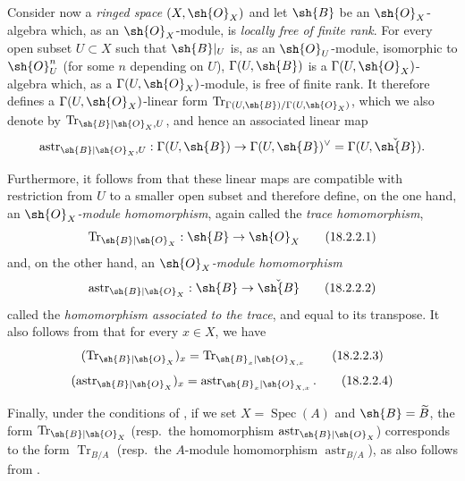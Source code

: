 \begin{env}[18.2.2]
\label{IV.18.2.2}
Consider now a \emph{ringed space} $(X,\sh{O}_X)$ and let $\sh{B}$ be an $\sh{O}_X$-algebra which, as an $\sh{O}_X$-module, is \emph{locally free of finite rank}.  For every open subset $U\subset X$ such that $\sh{B}|_U$ is, as an $\sh{O}_U$-module, isomorphic to $\sh{O}_U^n$ (for some $n$ depending on $U$), $\Gamma(U,\sh{B})$ is a $\Gamma(U,\sh{O}_X)$-algebra which, as a $\Gamma(U,\sh{O}_X)$-module, is free of finite rank.  It therefore defines a $\Gamma(U,\sh{O}_X)$-linear form $\operatorname{Tr}_{\Gamma(U,\sh{B})/\Gamma(U,\sh{O}_X)}$, which we also denote by $\operatorname{Tr}_{\sh{B}|\sh{O}_X,U}$, and hence an associated linear map
\[
\operatorname{astr}_{\sh{B}|\sh{O}_X,U}:\Gamma(U,\sh{B})\to\Gamma(U,\sh{B})^\vee=\Gamma(U,\check{\sh{B}}).
\]

Furthermore, it follows from  that these linear maps are compatible with restriction from $U$ to a smaller open subset and therefore define, on the one hand, an \emph{$\sh{O}_X$-module homomorphism}, again called the \emph{trace homomorphism},
\[
\label{IV.18.2.2.1}
\operatorname{Tr}_{\sh{B}|\sh{O}_X}:\sh{B}\to\sh{O}_X
\tag{18.2.2.1}
\]
and, on the other hand, an \emph{$\sh{O}_X$-module homomorphism}
\[
\label{IV.18.2.2.2}
\operatorname{astr}_{\sh{B}|\sh{O}_X}:\sh{B}\to\check{\sh{B}}
\tag{18.2.2.2}
\]
called the \emph{homomorphism associated to the trace}, and equal to its transpose.
It also follows from  that for every $x\in X$, we have
\[
\label{IV.18.2.2.3}
(\operatorname{Tr}_{\sh{B}|\sh{O}_X})_x=\operatorname{Tr}_{\sh{B}_x|\sh{O}_{X,x}}
\tag{18.2.2.3}
\]
\[
\label{IV.18.2.2.4}
(\operatorname{astr}_{\sh{B}|\sh{O}_X})_x=\operatorname{astr}_{\sh{B}_x|\sh{O}_{X,x}}.
\tag{18.2.2.4}
\]

Finally, under the conditions of , if we set $X=\operatorname{Spec}(A)$ and $\sh{B}=\widetilde{B}$, the form $\operatorname{Tr}_{\sh{B}|\sh{O}_X}$ (resp.\ the homomorphism $\operatorname{astr}_{\sh{B}|\sh{O}_X}$) corresponds to the form $\operatorname{Tr}_{B/A}$ (resp.\ the $A$-module homomorphism $\operatorname{astr}_{B/A}$), as also follows from .
\end{env}

